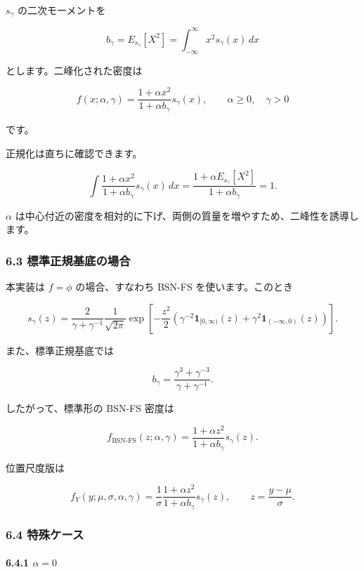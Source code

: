 \documentclass[
]{article}
\begin{document}
\(s_\gamma\) の二次モーメントを

\[
b_\gamma=E_{s_\gamma}[X^2]
=\int_{-\infty}^{\infty}x^2s_\gamma(x)\,dx
\]

とします。二峰化された密度は

\[
f(x;\alpha,\gamma)
=\frac{1+\alpha x^2}{1+\alpha b_\gamma}s_\gamma(x),
\qquad
\alpha\ge 0,
\quad
\gamma>0
\]

です。

正規化は直ちに確認できます。

\[
\int\frac{1+\alpha x^2}{1+\alpha b_\gamma}s_\gamma(x)\,dx
=\frac{1+\alpha E_{s_\gamma}[X^2]}{1+\alpha b_\gamma}=1.
\]

\(\alpha\)
は中心付近の密度を相対的に下げ、両側の質量を増やすため、二峰性を誘導します。

\hypertarget{ux6a19ux6e96ux6b63ux898fux57faux5e95ux306eux5834ux5408}{%
\subsubsection{6.3
標準正規基底の場合}\label{ux6a19ux6e96ux6b63ux898fux57faux5e95ux306eux5834ux5408}}

本実装は \(f=\phi\) の場合、すなわち BSN-FS を使います。このとき

\[
s_\gamma(z)
=\frac{2}{\gamma+\gamma^{-1} }\frac{1}{\sqrt{2\pi}}
\exp\left[-\frac{z^2}{2}\left(\gamma^{-2}\mathbf{1}_{[0,\infty)}(z)+\gamma^2\mathbf{1}_{(-\infty,0)}(z)\right)\right].
\]

また、標準正規基底では

\[
b_\gamma=\frac{\gamma^3+\gamma^{-3}}{\gamma+\gamma^{-1}}.
\]

したがって、標準形の BSN-FS 密度は

\[
f_{\mathrm{BSN\text{-}FS}}(z;\alpha,\gamma)
=\frac{1+\alpha z^2}{1+\alpha b_\gamma}s_\gamma(z).
\]

位置尺度版は

\[
f_Y(y;\mu,\sigma,\alpha,\gamma)
=\frac{1}{\sigma}
\frac{1+\alpha z^2}{1+\alpha b_\gamma}s_\gamma(z),
\qquad
z=\frac{y-\mu}{\sigma}.
\]

\hypertarget{ux7279ux6b8aux30b1ux30fcux30b9-1}{%
\subsubsection{6.4 特殊ケース}\label{ux7279ux6b8aux30b1ux30fcux30b9-1}}

\hypertarget{alpha0}{%
\paragraph{\texorpdfstring{6.4.1
\(\alpha=0\)}{6.4.1 \textbackslash alpha=0}}\label{alpha0}}
\end{document}
